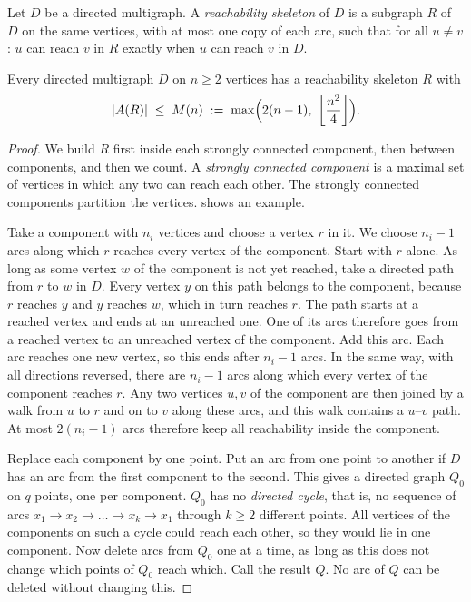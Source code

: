 \begin{definition}\label{def:reach-skeleton}
Let $D$ be a directed multigraph. A \emph{reachability skeleton} of $D$ is a subgraph $R$ of $D$ on the same vertices, with at most one copy of each arc, such that for all $u\ne v$: $u$ can reach $v$ in $R$ exactly when $u$ can reach $v$ in $D$.
\end{definition}

\begin{lemma}\label{lem:reach-skeleton}
Every directed multigraph $D$ on $n \ge 2$ vertices has a reachability skeleton $R$ with
\[
    |A(R)| \;\le\; M(n) \;:=\; \max\Bigl(2(n-1),\ \left\lfloor \frac{n^2}{4} \right\rfloor\Bigr).
\]
\end{lemma}

\begin{proof}
We build $R$ first inside each strongly connected component, then between components, and then we count.
A \emph{strongly connected component} is a maximal set of vertices in which any two can reach each other.
The strongly connected components partition the vertices.
 shows an example.

Take a component with $n_i$ vertices and choose a vertex $r$ in it.
We choose $n_i-1$ arcs along which $r$ reaches every vertex of the component.
Start with $r$ alone.
As long as some vertex $w$ of the component is not yet reached, take a directed path from $r$ to $w$ in $D$. Every vertex $y$ on this path belongs to the component, because $r$ reaches $y$ and $y$ reaches $w$, which in turn reaches $r$. The path starts at a reached vertex and ends at an unreached one. One of its arcs therefore goes from a reached vertex to an unreached vertex of the component.
Add this arc. Each arc reaches one new vertex, so this ends after $n_i-1$ arcs.
In the same way, with all directions reversed, there are $n_i-1$ arcs along which every vertex of the component reaches $r$.
Any two vertices $u,v$ of the component are then joined by a walk from $u$ to $r$ and on to $v$ along these arcs, and this walk contains a $u$--$v$ path.
At most $2(n_i - 1)$ arcs therefore keep all reachability inside the component.

Replace each component by one point.
Put an arc from one point to another if $D$ has an arc from the first component to the second.
This gives a directed graph $Q_0$ on $q$ points, one per component.
$Q_0$ has no \emph{directed cycle}, that is, no sequence of arcs $x_1\to x_2\to\dots\to x_k\to x_1$ through $k\ge2$ different points. All vertices of the components on such a cycle could reach each other, so they would lie in one component.
Now delete arcs from $Q_0$ one at a time, as long as this does not change which points of $Q_0$ reach which.
Call the result $Q$. No arc of $Q$ can be deleted without changing this.


\end{proof}
